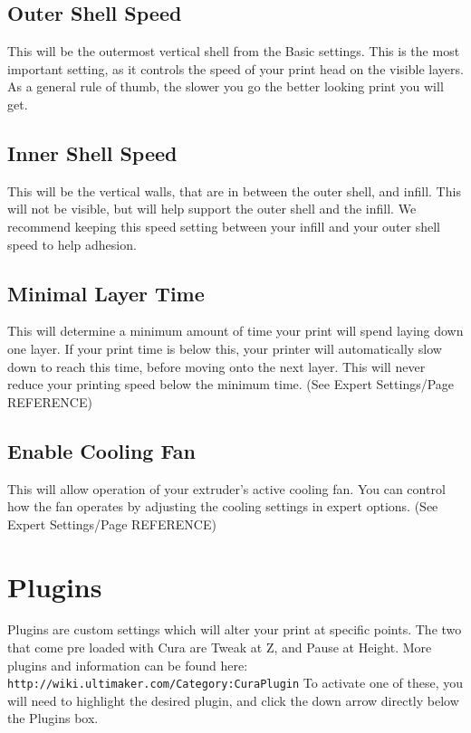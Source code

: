 \subsection{Outer Shell Speed}

This will be the outermost vertical shell from the Basic settings. This is the most important setting, as it controls the speed of your print head on the visible layers. As a general rule of thumb, the slower you go the better looking print you will get. 

\subsection{Inner Shell Speed}

This will be the vertical walls, that are in between the outer shell, 	and infill. This will not be visible, but will help support the outer shell and the infill. We recommend keeping this speed setting between your infill and your outer shell speed to help adhesion.

\subsection{Minimal Layer Time}

This will determine a minimum amount of time your print will spend laying down one layer. If your print time is below this, your printer will automatically slow down to reach this time, before moving onto the next layer. This will never reduce your printing speed below the minimum time. (See Expert Settings/Page REFERENCE)

\subsection{Enable Cooling Fan}

This will allow operation of your extruder's active cooling fan. You can control how the fan operates by adjusting the cooling settings in expert options. (See Expert Settings/Page REFERENCE)

\section{Plugins}

Plugins are custom settings which will alter your print at specific points. The two that come pre loaded with Cura are Tweak at Z, and Pause at Height. More plugins and information can be found here: \texttt{http://wiki.ultimaker.com/Category:CuraPlugin} To activate one of these, you will need to highlight the desired plugin, and click the down arrow directly below the Plugins box.

